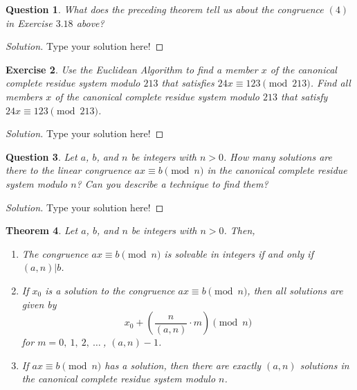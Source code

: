 \documentclass[11pt,leqno]{article}
\newtheorem{thm}{Theorem}[section]
\newtheorem{exer}[thm]{Exercise}
\newtheorem{ques}[thm]{Question}
\theoremstyle{definition}
\begin{document}
\begin{ques}
What does the preceding theorem tell us about the congruence $(4)$
in Exercise $3.18$ above?
\end{ques}

\begin{proof}[Solution]
Type your solution here!
\end{proof}


\begin{exer}
Use the Euclidean Algorithm to find a
member $x$ of the canonical complete residue system modulo $213$
that satisfies $24x \equiv 123 \pmod{213}$. Find all members $x$ of
the canonical complete residue system modulo $213$ that satisfy $24x
\equiv 123 \pmod{213}$.
\end{exer}

\begin{proof}[Solution]
Type your solution here!
\end{proof}


\begin{ques}
Let $a$, $b$, and $n$ be integers with $n > 0$.  How many solutions
are there to the linear congruence $ax \equiv b \pmod{n}$ in the
canonical complete residue system modulo $n$? Can you describe a
technique to find them?
\end{ques}

\begin{proof}[Solution]
Type your solution here!
\end{proof}


\begin{thm}
Let $a$, $b$, and $n$ be integers with $n > 0$. Then,
\begin{enumerate}
\item The congruence $ax \equiv b \pmod{n}$ is solvable in integers if
and only if $(a,n)|b$.
\item If $x_0$ is a solution to the congruence $ax \equiv b\pmod{n}$,
then all solutions are given by \[ x_0 + \left(\frac{n}{(a,n)}\cdot
m\right)\pmod{n}\] for $m = 0,\ 1,\ 2,\ \hdots\ $, $(a, n)-1$.
\item If $ax \equiv b \pmod{n}$ has a solution, then there are exactly
$(a, n)$ solutions in the canonical complete residue system modulo
$n$.
\end{enumerate}
\end{thm}
\end{document}
